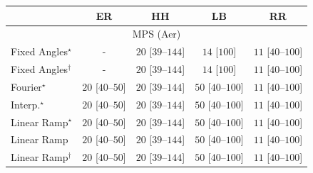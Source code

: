 \begin{tabular}{l|cccc|}
\toprule
            & ER & HH & LB & RR \\
\midrule
\multicolumn{5}{c}{\rule{0pt}{8pt}MPS (Aer)} \\
\midrule
Fixed Angles$^\star$ & {\cellcolor[HTML]{000000}} \color[HTML]{F1F1F1} {\cellcolor{white}} \color{black} - & {\cellcolor[HTML]{E8F6E4}} \color[HTML]{000000} $20$ [$39$--$144$] & {\cellcolor[HTML]{EDF8E9}} \color[HTML]{000000} $14$ [$100$] & {\cellcolor[HTML]{F0F9EC}} \color[HTML]{000000} $11$ [$40$--$100$] \\
Fixed Angles$^\dagger$ & {\cellcolor[HTML]{000000}} \color[HTML]{F1F1F1} {\cellcolor{white}} \color{black} - & {\cellcolor[HTML]{E8F6E4}} \color[HTML]{000000} $20$ [$39$--$144$] & {\cellcolor[HTML]{EDF8E9}} \color[HTML]{000000} $14$ [$100$] & {\cellcolor[HTML]{F0F9EC}} \color[HTML]{000000} $11$ [$40$--$100$] \\
Fourier$^\star$ & {\cellcolor[HTML]{E8F6E4}} \color[HTML]{000000} $20$ [$40$--$50$] & {\cellcolor[HTML]{E8F6E4}} \color[HTML]{000000} $20$ [$39$--$144$] & {\cellcolor[HTML]{C2E7BB}} \color[HTML]{000000} $50$ [$40$--$100$] & {\cellcolor[HTML]{F0F9EC}} \color[HTML]{000000} $11$ [$40$--$100$] \\
Interp.$^\star$ & {\cellcolor[HTML]{E8F6E4}} \color[HTML]{000000} $20$ [$40$--$50$] & {\cellcolor[HTML]{E8F6E4}} \color[HTML]{000000} $20$ [$39$--$144$] & {\cellcolor[HTML]{C2E7BB}} \color[HTML]{000000} $50$ [$40$--$100$] & {\cellcolor[HTML]{F0F9EC}} \color[HTML]{000000} $11$ [$40$--$100$] \\
Linear Ramp$^\star$ & {\cellcolor[HTML]{E8F6E4}} \color[HTML]{000000} $20$ [$40$--$50$] & {\cellcolor[HTML]{E8F6E4}} \color[HTML]{000000} $20$ [$39$--$144$] & {\cellcolor[HTML]{C2E7BB}} \color[HTML]{000000} $50$ [$40$--$100$] & {\cellcolor[HTML]{F0F9EC}} \color[HTML]{000000} $11$ [$40$--$100$] \\
Linear Ramp & {\cellcolor[HTML]{E8F6E4}} \color[HTML]{000000} $20$ [$40$--$50$] & {\cellcolor[HTML]{E8F6E4}} \color[HTML]{000000} $20$ [$39$--$144$] & {\cellcolor[HTML]{C2E7BB}} \color[HTML]{000000} $50$ [$40$--$100$] & {\cellcolor[HTML]{F0F9EC}} \color[HTML]{000000} $11$ [$40$--$100$] \\
Linear Ramp$^\dagger$ & {\cellcolor[HTML]{E8F6E4}} \color[HTML]{000000} $20$ [$40$--$50$] & {\cellcolor[HTML]{E8F6E4}} \color[HTML]{000000} $20$ [$39$--$144$] & {\cellcolor[HTML]{C2E7BB}} \color[HTML]{000000} $50$ [$40$--$100$] & {\cellcolor[HTML]{F0F9EC}} \color[HTML]{000000} $11$ [$40$--$100$] \\

\end{tabular}
